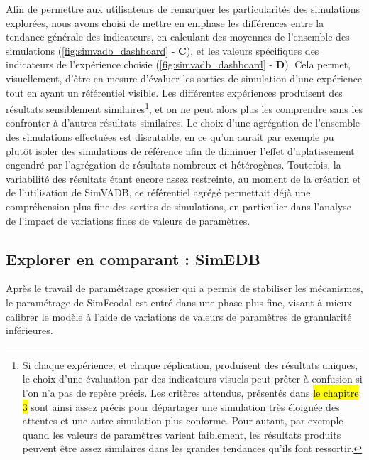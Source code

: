 	Afin de permettre aux utilisateurs de remarquer les particularités des simulations explorées, nous avons choisi de mettre en emphase les différences entre la tendance générale des indicateurs, en calculant des moyennes de l'ensemble des simulations (\cref{fig:simvadb_dashboard} - \textbf{C}), et les valeurs spécifiques des indicateurs de l'expérience choisie (\cref{fig:simvadb_dashboard} - \textbf{D}).
	Cela permet, visuellement, d'être en mesure d'évaluer les sorties de simulation d'une expérience tout en ayant un référentiel visible.
	Les différentes expériences produisent des résultats sensiblement similaires\footnote{
		Si chaque expérience, et chaque réplication, produisent des résultats uniques, le choix d'une évaluation par des indicateurs visuels peut prêter à confusion si l'on n'a pas de repère précis.
		Les critères attendus, présentés dans \hl{le chapitre 3} sont ainsi assez précis pour départager une simulation très éloignée des attentes et une autre simulation plus conforme.
		Pour autant, par exemple quand les valeurs de paramètres varient faiblement, les résultats produits peuvent être assez similaires dans les grandes tendances qu'ils font ressortir.

	}, et on ne peut alors plus les comprendre sans les confronter à d'autres résultats similaires.
	Le choix d'une agrégation de l'ensemble des simulations effectuées est discutable, en ce qu'on aurait par exemple pu plutôt isoler des simulations \og de référence \fg{} afin de diminuer l'effet \og d'aplatissement \fg{} engendré par l'agrégation de résultats nombreux et hétérogènes.
	Toutefois, la variabilité des résultats étant encore assez restreinte, au moment de la création et de l'utilisation de SimVADB, ce référentiel agrégé permettait déjà une compréhension plus fine des sorties de simulations, en particulier dans l'analyse de l'impact de variations fines de valeurs de paramètres.

	\subsection{Explorer en comparant : SimEDB}\label{subsec:explorer-simedb}

	Après le travail de paramétrage grossier qui a permis de stabiliser les mécanismes, le paramétrage de SimFeodal est entré dans une phase plus fine, visant à mieux calibrer le modèle à l'aide de variations de valeurs de paramètres de granularité inférieures.

